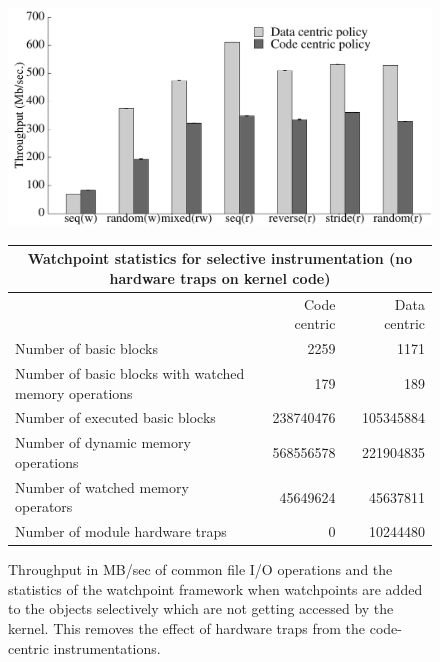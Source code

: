 \begin{figure}[!h]
\begin{center}
\includegraphics[width=6.0in]{thesis_selective_watch_no_inode.pdf}
\end{center}
\vspace{1em}
\begin{center}
\begin{tabular}{|l|r|r|}
  \hline
  \multicolumn{3}{|c|}{Watchpoint statistics for selective instrumentation (no hardware traps on kernel code)}  \\ \hline
  \hline
  & Code centric & Data centric \\
  \hline
  Number of basic blocks & 2259 & 1171 \\
  \hline
  Number of basic blocks with watched memory operations & 179 & 189 \\
  \hline
  Number of executed basic blocks &  238740476  & 105345884 \\
  \hline
  Number of dynamic memory operations & 568556578 & 221904835\\
  \hline
  Number of watched memory operators & 45649624 & 45637811\\
  \hline
  Number of module hardware traps & 0 & 10244480 \\
  \hline
\end{tabular}
\caption[Performance impact of selective instrumentations. The watchpoints are added on objects that are not getting accessed by the kernel code]{\label{fig:watchpoint_none_inode_compare} Throughput in MB/sec of common file I/O operations and the statistics of the watchpoint framework when watchpoints are added to the objects selectively which are not getting accessed by the kernel. This removes the effect of hardware traps from the code-centric instrumentations.}
\end{center}
\end{figure}

